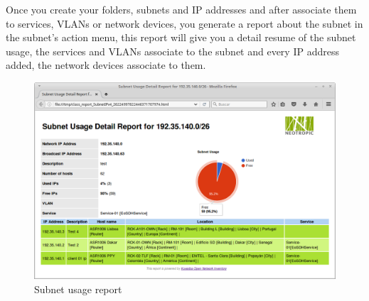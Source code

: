 \documentclass[a4paper]{article}
\begin{document}
		\newpage
		Once you create your folders, subnets and IP addresses and after associate them to services, VLANs or network devices, you generate a report about the subnet in the subnet's action menu, this report will give you a detail resume of the subnet usage, the services and VLANs associate to the subnet and every IP address added, the network devices associate to them.
		\begin{figure}[h!]
			\centering
			\includegraphics[width=1.1\linewidth]{img/ipam_report_subnet_usage_detail.png}
			\caption{Subnet usage report}
			\label{fig:ipam_report_subnet_usage_detail}
		\end{figure} 
		
		\newpage
\end{document}
